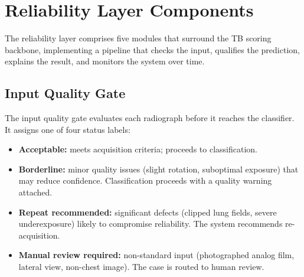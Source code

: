 \documentclass[conference, letterpaper]{IEEEtran}
\begin{document}
\section{Reliability Layer Components}

The reliability layer comprises five modules that surround the TB scoring backbone, implementing a pipeline that checks the input, qualifies the prediction, explains the result, and monitors the system over time.

\subsection{Input Quality Gate}

The input quality gate evaluates each radiograph before it reaches the classifier. It assigns one of four status labels:

\begin{itemize}
    \item \textbf{Acceptable:} meets acquisition criteria; proceeds to classification.
    \item \textbf{Borderline:} minor quality issues (slight rotation, suboptimal exposure) that may reduce confidence. Classification proceeds with a quality warning attached.
    \item \textbf{Repeat recommended:} significant defects (clipped lung fields, severe underexposure) likely to compromise reliability. The system recommends re-acquisition.
    \item \textbf{Manual review required:} non-standard input (photographed analog film, lateral view, non-chest image). The case is routed to human review.
\end{itemize}
\end{document}
